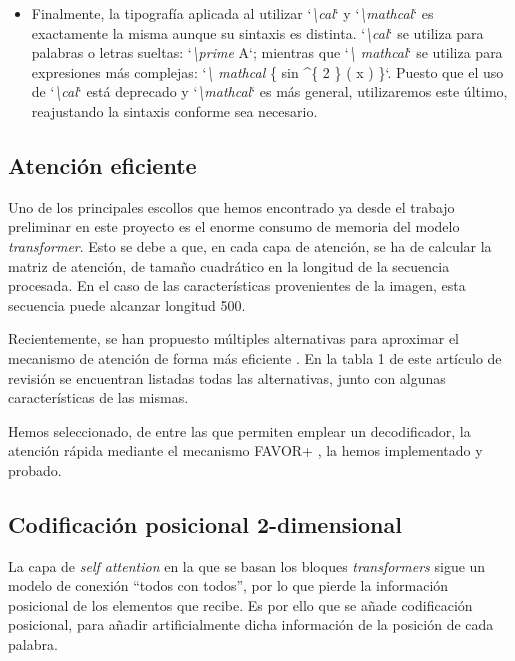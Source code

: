 \documentclass[a4paper, 20pt, dvipsnames]{article}
\begin{document}
\begin{itemize}
\item
  Finalmente, la tipografía aplicada al utilizar `\emph{\textbackslash cal}` y
  `\emph{\textbackslash mathcal}` es exactamente la misma aunque su sintaxis es
  distinta. `\emph{\textbackslash cal}` se utiliza para palabras o letras
  sueltas: `\emph{\textbackslash prime} A`; mientras que `\emph{\textbackslash
    mathcal}` se utiliza para expresiones más complejas: `\emph{\textbackslash
    mathcal} \{ sin \textasciicircum \{ 2 \} ( x ) \}`. Puesto que el uso de
  `\emph{\textbackslash cal}` está deprecado y `\emph{\textbackslash mathcal}`
  es más general, utilizaremos este último, reajustando la sintaxis conforme sea
  necesario.
\end{itemize}

\subsection{Atención eficiente}
\label{feature:fast-att}

Uno de los principales escollos que hemos encontrado ya desde el trabajo
preliminar en este proyecto es el enorme consumo de memoria del modelo
\emph{transformer}. Esto se debe a que, en cada capa de atención, se ha de
calcular la matriz de atención, de tamaño cuadrático en la longitud de la
secuencia procesada. En el caso de las características provenientes de la
imagen, esta secuencia puede alcanzar longitud 500.

Recientemente, se han propuesto múltiples alternativas para aproximar el
mecanismo de atención de forma más eficiente \cite{tay2020efficient}. En la
tabla 1 de este artículo de revisión se encuentran listadas todas las
alternativas, junto con algunas características de las mismas.

Hemos seleccionado, de entre las que permiten emplear un decodificador, la
atención rápida mediante el mecanismo FAVOR+ \cite{choromanski_rethinking_2020},
la hemos implementado y probado.


\subsection{Codificación posicional 2-dimensional}

La capa de \emph{self attention} en la que se basan los bloques \textit{transformers}
sigue un modelo de conexión ``todos con todos'', por lo que pierde la información
posicional de los elementos que recibe. Es por ello que se añade codificación
posicional, para añadir artificialmente dicha información de la posición de cada
palabra.
\end{document}
